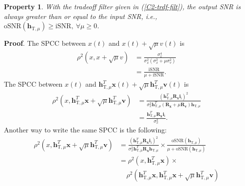 \documentclass[10pt,pdflatex,headrule,landscape]{beamer}
\newtheorem{property}{Property}[section]
\begin{document}
\begin{frame}[allowframebreaks]

\begin{property}
With the tradeoff filter given in (\ref{C2-trdf-filt}), the output SNR is always greater than or equal to the input SNR, i.e., $\mathrm{oSNR}\left(\mathbf{h}_{\mathrm{T},\mu} \right) \geq \mathrm{iSNR}, \ \forall \mu \geq 0$.
\end{property}

\noindent \textbf{Proof}.
The SPCC between $x(t)$ and $x(t)+\sqrt{\mu} v(t)$ is
\begin{align*}
 \rho^2 \left( x, x+\sqrt{\mu} v \right) &= \frac{ \sigma_x^4 }
 { \sigma_x^2 \left( \sigma_x^2 + \mu \sigma_v^2 \right) } \\
 &= \frac{ \mathrm{iSNR} } { \mu + \mathrm{iSNR} }.
\end{align*}
The SPCC between $x(t)$ and $\mathbf{h}_{\mathrm{T},\mu}^T \mathbf{x}(t)+\sqrt{\mu} \mathbf{h}_{\mathrm{T},\mu}^T \mathbf{v}(t)$ is
\begin{align*}
 \rho^2 \left( x, \mathbf{h}_{\mathrm{T},\mu}^T \mathbf{x}+\sqrt{\mu} \mathbf{h}_{\mathrm{T},\mu}^T \mathbf{v} \right) &=
 \frac{ \left( \mathbf{h}_{\mathrm{T},\mu}^T \mathbf{R}_{\mathbf{x}} \mathbf{i}_{\mathrm{i}} \right)^2 }
 { \sigma_x^2 \mathbf{h}_{\mathrm{T},\mu}^T \left( \mathbf{R}_{\mathbf{x}} +
 \mu \mathbf{R}_{\mathbf{v}} \right) \mathbf{h}_{\mathrm{T},\mu} } \\
 &= \frac{ \mathbf{h}_{\mathrm{T},\mu}^T \mathbf{R}_{\mathbf{x}} \mathbf{i}_{\mathrm{i}} } { \sigma_x^2 }.
\end{align*}
Another way to write the same SPCC is the following:
\begin{align*}
 \rho^2 \left( x, \mathbf{h}_{\mathrm{T},\mu}^T \mathbf{x}+\sqrt{\mu} \mathbf{h}_{\mathrm{T},\mu}^T \mathbf{v} \right) &=
 \frac{ \left( \mathbf{h}_{\mathrm{T},\mu}^T \mathbf{R}_{\mathbf{x}} \mathbf{i}_{\mathrm{i}} \right)^2 }
 { \sigma_x^2 \mathbf{h}_{\mathrm{T},\mu}^T \mathbf{R}_{\mathbf{x}} \mathbf{h}_{\mathrm{T},\mu} } \times
 \frac{ \mathrm{oSNR} \left( \mathbf{h}_{\mathrm{T},\mu} \right) } { \mu + \mathrm{oSNR} \left( \mathbf{h}_{\mathrm{T},\mu} \right) } \\
 &= \rho^2 \left( x, \mathbf{h}_{\mathrm{T},\mu}^T \mathbf{x} \right) \times \nonumber \\
 &~~~~~ \rho^2 \left( \mathbf{h}_{\mathrm{T},\mu}^T \mathbf{x}, \mathbf{h}_{\mathrm{T},\mu}^T \mathbf{x}
 + \sqrt{\mu} \mathbf{h}_{\mathrm{T},\mu}^T \mathbf{v} \right) \nonumber \\

\end{align*}
\end{frame}
\end{document}
